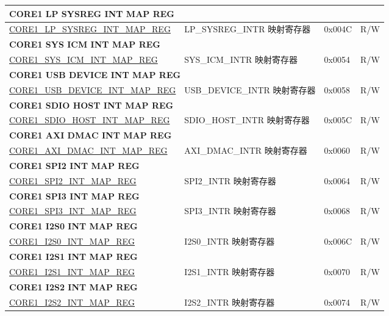 \begin{longtable}{ | p{7.5cm} | p{7.2cm} | p{1.3cm} | p{1cm} | }
\multicolumn{4}{|l|}{\textbf{CORE1 LP SYSREG INT MAP REG}} \\ \hline
\hyperref[regdesc:CORE1LPSYSREGINTMAPREG]{CORE1\_LP\_SYSREG\_INT\_MAP\_REG} & LP\_SYSREG\_INTR 映射寄存器 & 0x004C & R/W \\ \hline
\multicolumn{4}{|l|}{\textbf{CORE1 SYS ICM INT MAP REG}} \\ \hline
\hyperref[regdesc:CORE1SYSICMINTMAPREG]{CORE1\_SYS\_ICM\_INT\_MAP\_REG} & SYS\_ICM\_INTR 映射寄存器 & 0x0054 & R/W \\ \hline
\multicolumn{4}{|l|}{\textbf{CORE1 USB DEVICE INT MAP REG}} \\ \hline
\hyperref[regdesc:CORE1USBDEVICEINTMAPREG]{CORE1\_USB\_DEVICE\_INT\_MAP\_REG} & USB\_DEVICE\_INTR 映射寄存器 & 0x0058 & R/W \\ \hline
\multicolumn{4}{|l|}{\textbf{CORE1 SDIO HOST INT MAP REG}} \\ \hline
\hyperref[regdesc:CORE1SDIOHOSTINTMAPREG]{CORE1\_SDIO\_HOST\_INT\_MAP\_REG} & SDIO\_HOST\_INTR 映射寄存器 & 0x005C & R/W \\ \hline
\multicolumn{4}{|l|}{\textbf{CORE1 AXI DMAC INT MAP REG}} \\ \hline
\hyperref[regdesc:CORE1AXIDMACINTMAPREG]{CORE1\_AXI\_DMAC\_INT\_MAP\_REG} & AXI\_DMAC\_INTR 映射寄存器 & 0x0060 & R/W \\ \hline
\multicolumn{4}{|l|}{\textbf{CORE1 SPI2 INT MAP REG}} \\ \hline
\hyperref[regdesc:CORE1SPI2INTMAPREG]{CORE1\_SPI2\_INT\_MAP\_REG} & SPI2\_INTR 映射寄存器 & 0x0064 & R/W \\ \hline
\multicolumn{4}{|l|}{\textbf{CORE1 SPI3 INT MAP REG}} \\ \hline
\hyperref[regdesc:CORE1SPI3INTMAPREG]{CORE1\_SPI3\_INT\_MAP\_REG} & SPI3\_INTR 映射寄存器 & 0x0068 & R/W \\ \hline
\multicolumn{4}{|l|}{\textbf{CORE1 I2S0 INT MAP REG}} \\ \hline
\hyperref[regdesc:CORE1I2S0INTMAPREG]{CORE1\_I2S0\_INT\_MAP\_REG} & I2S0\_INTR 映射寄存器 & 0x006C & R/W \\ \hline
\multicolumn{4}{|l|}{\textbf{CORE1 I2S1 INT MAP REG}} \\ \hline
\hyperref[regdesc:CORE1I2S1INTMAPREG]{CORE1\_I2S1\_INT\_MAP\_REG} & I2S1\_INTR 映射寄存器 & 0x0070 & R/W \\ \hline
\multicolumn{4}{|l|}{\textbf{CORE1 I2S2 INT MAP REG}} \\ \hline
\hyperref[regdesc:CORE1I2S2INTMAPREG]{CORE1\_I2S2\_INT\_MAP\_REG} & I2S2\_INTR 映射寄存器 & 0x0074 & R/W \\ \hline

\end{longtable}
